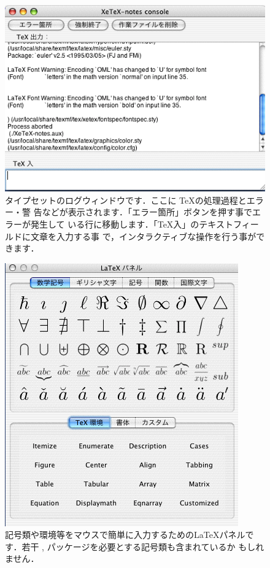 \begin{figure}[htpb]
 \begin{center}
 \includegraphics[scale=.4]{images/TeXShop04} 
 \caption[\TeX Shop のログウィンドウ]{
  タイプセットのログウィンドウです．ここに \TeX の処理過程とエラー・警
  告などが表示されます．「エラー箇所」ボタンを押す事でエラーが発生して
  いる行に移動します．「\TeX 入」のテキストフィールドに文章を入力する事
  で，インタラクティブな操作を行う事ができます．}
 \end{center}
\end{figure}

\begin{figure}[htbp]
 \begin{center}
 \includegraphics[scale=.4]{images/TeXShop05} 
  \caption[\TeX Shop の\LaTeX パネル]{
  記号類や環境等をマウスで簡単に入力するための\LaTeX パネルです．若干
  ,  パッケージを必要とする記号類も含まれているか
  もしれません．}
 \end{center}
\end{figure}

